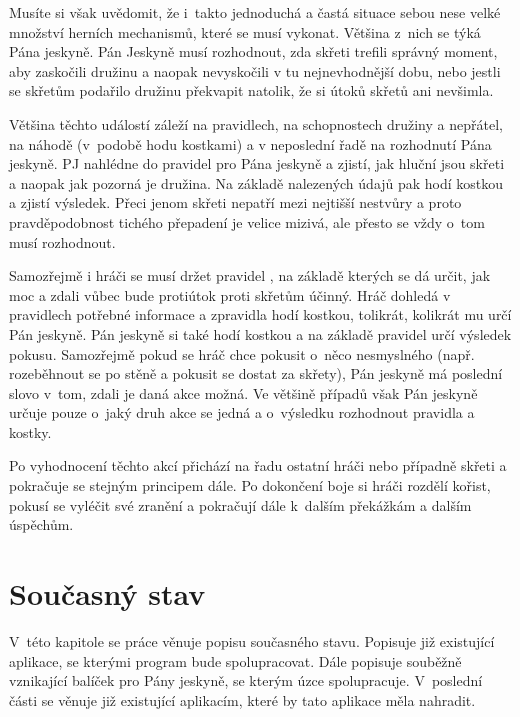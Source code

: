 \documentclass[thesis=B,czech]{resources/FITthesis}[2012/06/26]
\begin{document}
Musíte si však uvědomit, že i~takto jednoduchá a častá situace sebou nese velké množství herních mechanismů, které se musí vykonat. Většina z~nich se týká Pána jeskyně. Pán Jeskyně musí rozhodnout, zda skřeti trefili správný moment, aby zaskočili družinu a naopak nevyskočili v tu nejnevhodnější dobu, nebo jestli se skřetům podařilo družinu překvapit natolik, že si útoků skřetů ani nevšimla. \par

Většina těchto událostí záleží na pravidlech, na schopnostech družiny a nepřátel, na náhodě (v~podobě hodu kostkami) a v neposlední řadě na rozhodnutí Pána jeskyně. PJ nahlédne do pravidel pro Pána jeskyně\cite{draci_doupe_PJ} a zjistí, jak hluční jsou skřeti a naopak jak pozorná je družina. Na základě nalezených údajů pak hodí kostkou a zjistí výsledek. Přeci jenom skřeti nepatří mezi nejtišší nestvůry a proto pravděpodobnost tichého přepadení je velice mizivá, ale přesto se vždy o~tom musí rozhodnout. \par

Samozřejmě i hráči se musí držet pravidel \cite{draci_doupe}, na základě kterých se dá určit, jak moc a zdali vůbec bude protiútok proti skřetům účinný. Hráč dohledá v pravidlech potřebné informace a zpravidla hodí kostkou, tolikrát, kolikrát mu určí Pán jeskyně. Pán jeskyně si také hodí kostkou a na základě pravidel určí výsledek pokusu. Samozřejmě pokud se hráč chce pokusit o~něco nesmyslného (např. rozeběhnout se po stěně a pokusit se dostat za skřety), Pán jeskyně má poslední slovo v~tom, zdali je daná akce možná. Ve většině případů však Pán jeskyně určuje pouze o~jaký druh akce se jedná a o~výsledku rozhodnout pravidla a kostky. \par

Po vyhodnocení těchto akcí přichází na řadu ostatní hráči nebo případně skřeti a pokračuje se stejným principem dále. Po dokončení boje si hráči rozdělí kořist, pokusí se vyléčit své zranění a pokračují dále k~dalším překážkám a dalším úspěchům.


\chapter{Současný stav}
V~této kapitole se práce věnuje popisu současného stavu. Popisuje již existující aplikace, se kterými program bude spolupracovat. Dále popisuje souběžně vznikající balíček pro Pány jeskyně, se kterým úzce spolupracuje. V~poslední části se věnuje již existující aplikacím, které by tato aplikace měla nahradit.
\end{document}
